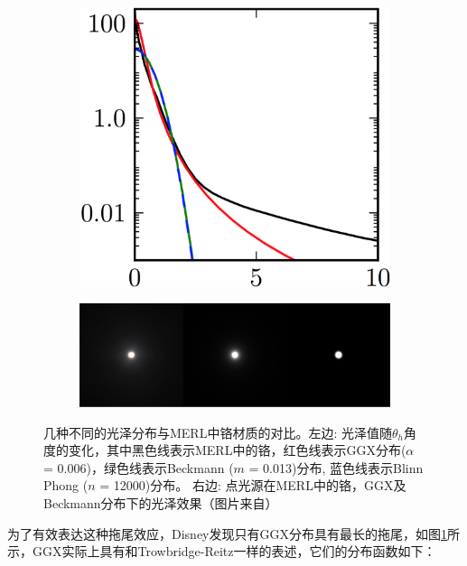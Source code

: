 \begin{figure}
\begin{fullwidth}
	\begin{subfigure}[b]{0.27\thewidth}
		\includegraphics[width=1.\textwidth]{graphics/gi/ray-optics-13-1}
	\end{subfigure}
	\begin{subfigure}[b]{0.72\thewidth}
		\includegraphics[width=1.\textwidth]{graphics/gi/ray-optics-13-2}
	\end{subfigure}
\caption{几种不同的光泽分布与MERL中铬材质的对比。左边: 光泽值随$\theta_h$角度的变化，其中黑色线表示MERL中的铬，红色线表示GGX分布($\alpha$ = 0.006)，绿色线表示Beckmann ($m$ = 0.013)分布, 蓝色线表示Blinn Phong ($n$ = 12000)分布。 右边: 点光源在MERL中的铬，GGX及Beckmann分布下的光泽效果（图片来自\cite{a:PhysicallyBasedShadingatDisney}）}
\label{f:intro-specular-lob-tails}
\end{fullwidth}
\end{figure}

为了有效表达这种拖尾效应，Disney发现只有GGX分布\cite{a:Microfacetmodelsforrefractionthroughroughsurfaces}具有最长的拖尾，如图\ref{f:intro-specular-lob-tails}所示，GGX实际上具有和Trowbridge-Reitz\cite{a:Averageirregularityrepresentationofaroughrayreflection}一样的表述，它们的分布函数如下：

